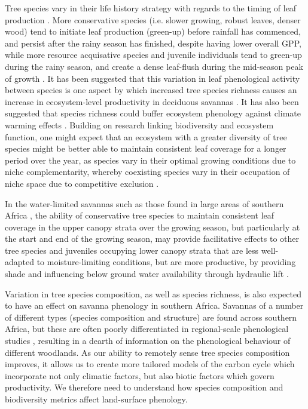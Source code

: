 \documentclass[11pt,a4paper]{article}
\begin{document}
Tree species vary in their life history strategy with regards to the timing of leaf production \citep{Fenner1998, Cole2017, Medina1994}. More conservative species (i.e. slower growing, robust leaves, denser wood) tend to initiate leaf production (green-up) before rainfall has commenced, and persist after the rainy season has finished, despite having lower overall GPP, while more resource acquisative species and juvenile individuals tend to green-up during the rainy season, and create a dense leaf-flush during the mid-season peak of growth \citep{}. It has been suggested that this variation in leaf phenological activity between species is one aspect by which increased tree species richness causes an increase in ecosystem-level productivity in deciduous savannas \citep{}. It has also been suggested that species richness could buffer ecosystem phenology against climate warming effects \citep{Parmesan2007}. Building on research linking biodiversity and ecosystem function, one might expect that an ecosystem with a greater diversity of tree species might be better able to maintain consistent leaf coverage for a longer period over the year, as species vary in their optimal growing conditions due to niche complementarity, whereby coexisting species vary in their occupation of niche space due to competitive exclusion \citep{}.

In the water-limited savannas such as those found in large areas of southern Africa \citep{}, the ability of conservative tree species to maintain consistent leaf coverage in the upper canopy strata over the growing season, but particularly at the start and end of the growing season, may provide facilitative effects to other tree species and juveniles occupying lower canopy strata that are less well-adapted to moisture-limiting conditions, but are more productive, by providing shade and influencing below ground water availability through hydraulic lift \citep{}. 

Variation in tree species composition, as well as species richness, is also expected to have an effect on savanna phenology in southern Africa. Savannas of a number of different types (species composition and structure) are found across southern Africa, but these are often poorly differentiated in regional-scale phenological studies \citep{}, resulting in a dearth of information on the phenological behaviour of different woodlands. As our ability to remotely sense tree species composition improves, it allows us to create more tailored models of the carbon cycle which incorporate not only climatic factors, but also biotic factors which govern productivity. We therefore need to understand how species composition and biodiversity metrics affect land-surface phenology. 
\end{document}
